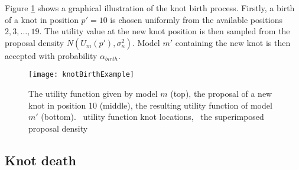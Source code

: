 Figure \ref{fig:knotBirthExample} shows a graphical illustration of the knot birth process. Firstly, a birth of a knot
in position \(p' = 10\) is chosen uniformly from the available positions \(2, 3, \ldots, 19\). The utility value at the
new knot position is then sampled from the proposal density \(N(U_m(p'), \sigma^2_\kappa)\). Model \(m'\) containing the
new knot is then accepted with probability \(\alpha_{birth}\).
\begin{figure}[htp]
\begin{center}
  \texttt{[image: knotBirthExample]}
  \caption{\label{fig:knotBirthExample} The utility function given by model \(m\) (top), the proposal of a new knot in
  position 10 (middle), the resulting utility function of model \(m'\) (bottom). \protect\blackFilledCircle\ utility
  function knot locations, \protect\blackDashedLine\ the superimposed proposal density}
\end{center}
\end{figure}

\subsection{Knot death}
\label{sec:Knot_death}

